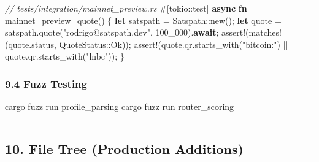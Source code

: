 \documentclass[
]{article}
\newenvironment{Shaded}{}{}
\newcommand{\AttributeTok}[1]{\textcolor[rgb]{0.49,0.56,0.16}{#1}}
\newcommand{\CommentTok}[1]{\textcolor[rgb]{0.38,0.63,0.69}{\textit{#1}}}
\newcommand{\ConstantTok}[1]{\textcolor[rgb]{0.53,0.00,0.00}{#1}}
\newcommand{\DecValTok}[1]{\textcolor[rgb]{0.25,0.63,0.44}{#1}}
\newcommand{\ExtensionTok}[1]{#1}
\newcommand{\KeywordTok}[1]{\textcolor[rgb]{0.00,0.44,0.13}{\textbf{#1}}}
\newcommand{\NormalTok}[1]{#1}
\newcommand{\OperatorTok}[1]{\textcolor[rgb]{0.40,0.40,0.40}{#1}}
\newcommand{\PreprocessorTok}[1]{\textcolor[rgb]{0.74,0.48,0.00}{#1}}
\newcommand{\StringTok}[1]{\textcolor[rgb]{0.25,0.44,0.63}{#1}}
\begin{document}
\begin{Shaded}
\begin{Highlighting}[]
\CommentTok{// tests/integration/mainnet\_preview.rs}
\AttributeTok{\#[}\PreprocessorTok{tokio::}\NormalTok{test}\AttributeTok{]}
\KeywordTok{async} \KeywordTok{fn}\NormalTok{ mainnet\_preview\_quote() }\OperatorTok{\{}
    \KeywordTok{let}\NormalTok{ satspath }\OperatorTok{=} \PreprocessorTok{Satspath::}\NormalTok{new()}\OperatorTok{;}
    \KeywordTok{let}\NormalTok{ quote }\OperatorTok{=}\NormalTok{ satspath}\OperatorTok{.}\NormalTok{quote(}\StringTok{"rodrigo@satspath.dev"}\OperatorTok{,} \DecValTok{100\_000}\NormalTok{)}\OperatorTok{.}\KeywordTok{await}\OperatorTok{;}
    \PreprocessorTok{assert!}\NormalTok{(}\PreprocessorTok{matches!}\NormalTok{(quote}\OperatorTok{.}\NormalTok{status}\OperatorTok{,} \PreprocessorTok{QuoteStatus::}\ConstantTok{Ok}\NormalTok{))}\OperatorTok{;}
    \PreprocessorTok{assert!}\NormalTok{(quote}\OperatorTok{.}\NormalTok{qr}\OperatorTok{.}\NormalTok{starts\_with(}\StringTok{"bitcoin:"}\NormalTok{) }\OperatorTok{||}\NormalTok{ quote}\OperatorTok{.}\NormalTok{qr}\OperatorTok{.}\NormalTok{starts\_with(}\StringTok{"lnbc"}\NormalTok{))}\OperatorTok{;}
\OperatorTok{\}}
\end{Highlighting}
\end{Shaded}

\hypertarget{fuzz-testing}{%
\subsubsection{9.4 Fuzz Testing}\label{fuzz-testing}}

\begin{Shaded}
\begin{Highlighting}[]
\ExtensionTok{cargo}\NormalTok{ fuzz run profile\_parsing}
\ExtensionTok{cargo}\NormalTok{ fuzz run router\_scoring}
\end{Highlighting}
\end{Shaded}

\begin{center}\rule{0.5\linewidth}{0.5pt}\end{center}

\hypertarget{file-tree-production-additions}{%
\subsection{10. File Tree (Production
Additions)}\label{file-tree-production-additions}}
\end{document}
